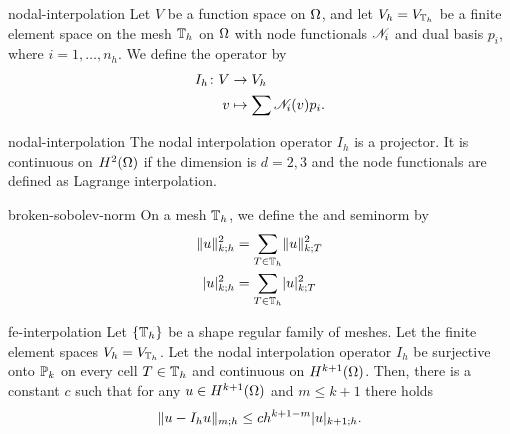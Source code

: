 \begin{Definition}{nodal-interpolation}
  Let $V$ be a function space on $\domain$, and let
  $V_h = V_{\mesh_h}$ be a finite element space on the mesh $\mesh_h$
  on $\domain$ with node functionals $\nodal_i$ and dual basis $p_i$,
  where $i=1,\dots,n_h$. We define the 
  operator by
  \begin{gather}
    \begin{split}
      I_h\colon V&\to V_h\\
      v &\mapsto \sum \nodal_i(v)p_i.
    \end{split}
  \end{gather}
\end{Definition}

\begin{Lemma}{nodal-interpolation}
  The nodal interpolation operator $I_h$ is a projector. It is
  continuous on $H^2(\domain)$ if the dimension is $d=2,3$ and the
  node functionals are defined as Lagrange interpolation.
\end{Lemma}

\begin{Definition}{broken-sobolev-norm}
  On a mesh $\mesh_h$, we define the  and
  seminorm by
  \begin{gather}
    \begin{split}
      \norm{u}_{k;h}^2 &= \sum_{\cell\in\mesh_h} \norm{u}_{k;\cell}^2\\
      \snorm{u}_{k;h}^2 &= \sum_{\cell\in\mesh_h} \snorm{u}_{k;\cell}^2
    \end{split}
  \end{gather}
\end{Definition}

\begin{Theorem}{fe-interpolation}
  Let $\{\mesh_h\}$ be a shape regular family of meshes.
  Let the finite element spaces $V_h = V_{\mesh_h}$. Let the nodal
  interpolation operator $I_h$ be surjective onto $\P_k$ on every cell
  $\cell\in\mesh_h$ and continuous on $H^{k+1}(\domain)$. Then, there
  is a constant $c$ such that for any $u\in H^{k+1}(\domain)$ and
  $m\le k+1$ there holds
  \begin{gather}
    \label{eq:fe-interpolation}
    \norm{u-I_h u}_{m;h} \le c h^{k+1-m} \snorm{u}_{k+1;h}.
  \end{gather}
\end{Theorem}

